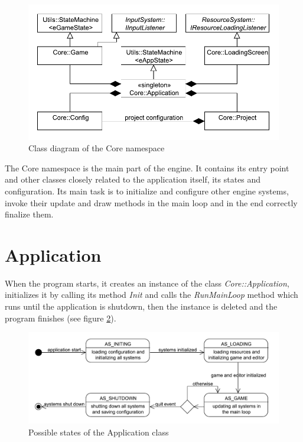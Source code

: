 \documentclass[a4paper, 12pt]{report}
\begin{document}
\begin{figure}[htbp]
	\centering
		\includegraphics[width=1\textwidth]{CoreClassDiagram.pdf}
	\caption{Class diagram of the Core namespace}
	\label{fig:core-diagram}
\end{figure}

The Core namespace is the main part of the engine. It contains its entry point and other classes closely related to the application itself, its states and configuration. Its main task is to initialize and configure other engine systems, invoke their update and draw methods in the main loop and in the end correctly finalize them.

\section{Application}

When the program starts, it creates an instance of the class \emph{Core::Application}, initializes it by calling its method \emph{Init} and calls the \emph{RunMainLoop} method which runs until the application is shutdown, then the instance is deleted and the program finishes (see figure \ref{fig:application-states}).

\begin{figure}[htbp]
	\centering
		\includegraphics[width=1\textwidth]{ApplicationStates.pdf}
	\caption{Possible states of the Application class}
	\label{fig:application-states}
\end{figure}
\end{document}
